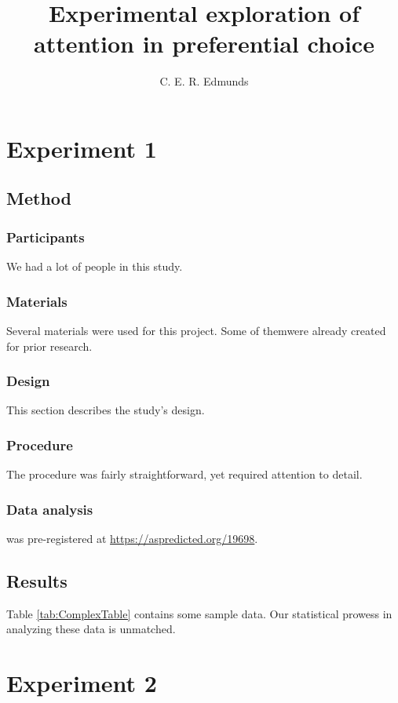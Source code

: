 \documentclass[doc, a4paper, apacite]{apa6}
\title{Experimental exploration of attention in preferential choice}
\author{C. E. R. Edmunds}
\affiliation{University of Warwick}
\begin{document}
\maketitle


\section{Experiment 1} \label{exp:NS01} 
\subsection{Method}
\subsubsection{Participants}
We had a lot of people in this study.

\subsubsection{Materials}
Several materials were used for this project.  Some of themwere
already created for prior research.

\subsubsection{Design}
This section describes the study's design.

\subsubsection{Procedure}
The procedure was fairly straightforward, yet required
attention to detail.

\subsubsection{Data analysis}
 was pre-registered at \url{https://aspredicted.org/19698}.

\subsection{Results}
Table \ref{tab:ComplexTable} contains some sample data.  Our
statistical prowess in analyzing these data is unmatched.


\section{Experiment 2} \label{exp:NS07}
\end{document}
